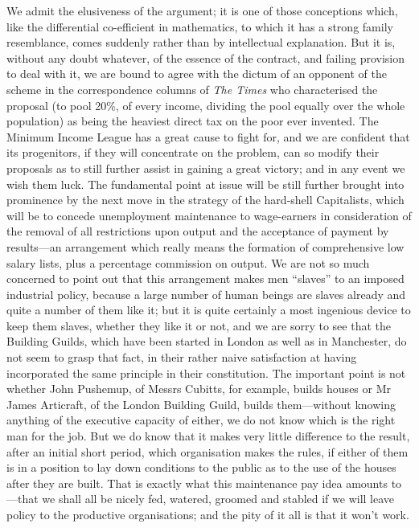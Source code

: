 \documentclass{book}
\begin{document}
We admit the elusiveness of the argument; it is one of those conceptions which, like the differential co-efficient in mathematics, to which it has a strong family resemblance, comes suddenly rather than by intellectual explanation. But it is, without any doubt whatever, of the essence of the contract, and failing provision to deal with it, we are bound to agree with the dictum of an opponent of the scheme in the correspondence columns of \emph{The Times} who characterised the proposal (to pool 20\%, of every income, dividing the pool equally over the whole population) as being the heaviest direct tax on the poor ever invented. The Minimum Income League has a great cause to fight for, and we are confident that its progenitors, if they will concentrate on the problem, can so modify their proposals as to still further assist in gaining a great victory; and in any event we wish them luck. The fundamental point at issue will be still further brought into prominence by the next move in the strategy of the hard-shell Capitalists, which will be to concede unemployment maintenance to wage-earners in consideration of the removal of all restrictions upon output and the acceptance of payment by results—an arrangement which really means the formation of comprehensive low salary lists, plus a percentage commission on output. We are not so much concerned to point out that this arrangement makes men “slaves” to an imposed industrial policy, because a large number of human beings are slaves already and quite a number of them like it; but it is quite certainly a most ingenious device to keep them slaves, whether they like it or not, and we are sorry to see that the Building Guilds, which have been started in London as well as in Manchester, do not seem to grasp that fact, in their rather naive satisfaction at having incorporated the same principle in their constitution. The important point is not whether John Pushemup, of Messrs Cubitts, for example, builds houses or Mr James Articraft, of the London Building Guild, builds them—without knowing anything of the executive capacity of either, we do not know which is the right man for the job. But we do know that it makes very little difference to the result, after an initial short period, which organisation makes the rules, if either of them is in a position to lay down conditions to the public as to the use of the houses after they are built. That is exactly what this maintenance pay idea amounts to—that we shall all be nicely fed, watered, groomed and stabled if we will leave policy to the productive organisations; and the pity of it all is that it won’t work.
\end{document}
